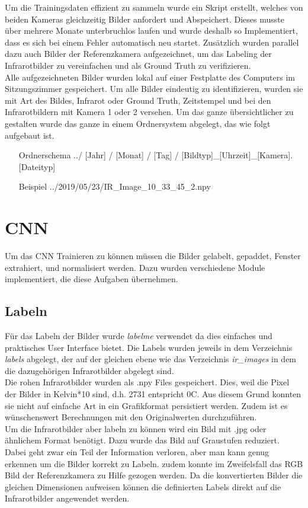 Um die Trainingsdaten effizient zu sammeln wurde ein  Skript erstellt, welches von beiden Kameras gleichzeitig Bilder anfordert und Abspeichert. Dieses musste über mehrere Monate unterbruchlos laufen und wurde deshalb so Implementiert, dass es sich bei einem Fehler automatisch neu startet. Zusätzlich wurden parallel dazu auch Bilder der Referenzkamera aufgezeichnet, um das Labeling der Infrarotbilder zu vereinfachen und als Ground Truth zu verifizieren.\\
Alle aufgezeichneten Bilder wurden lokal auf einer Festplatte des Computers im Sitzungszimmer gespeichert. Um alle Bilder eindeutig zu identifizieren, wurden sie mit Art des Bildes, Infrarot oder Ground Truth, Zeitstempel und bei den Infrarotbildern mit Kamera 1 oder 2 versehen. Um das ganze übersichtlicher zu gestalten wurde das ganze in einem Ordnersystem abgelegt, das wie folgt aufgebaut ist.

\begin{itemize}[leftmargin=4cm, align=left, labelsep=*, labelwidth=*]
	\item[Ordnerschema] ../ [Jahr] / [Monat] / [Tag] / [Bildtyp]\_[Uhrzeit]\_[Kamera].[Dateityp]
	\item[Beispiel] ../2019/05/23/IR\_Image\_10\_33\_45\_2.npy
\end{itemize}


\section{CNN}

Um das \gls{CNN} Trainieren zu können müssen die Bilder gelabelt, gepaddet, Fenster extrahiert, und normalisiert werden. Dazu wurden verschiedene Module implementiert, die diese Aufgaben übernehmen.

\subsection{Labeln}
\label{sec:labeling}

Für das Labeln der Bilder wurde \textit{labelme}\parencite{labelme2016} verwendet da dies einfaches und praktisches User Interface bietet. Die Labels wurden jeweils in dem Verzeichnis \textit{labels} abgelegt, der auf der gleichen ebene wie das Verzeichnis \textit{ir\_images} in dem die dazugehörigen Infrarotbilder abgelegt sind.\\
Die rohen Infrarotbilder wurden als .npy \parencite{npyformat} Files gespeichert. Dies, weil die Pixel der Bilder in Kelvin*10 sind, d.h. 2731 entspricht 0\degree C. Aus diesem Grund konnten sie nicht auf einfache Art in ein Grafikformat persistiert werden. Zudem ist es wünschenswert Berechnungen mit den Originalwerten durchzuführen.\\
Um die Infrarotbilder aber labeln zu können wird ein Bild mit .jpg oder ähnlichem Format benötigt. Dazu wurde das Bild auf Graustufen reduziert. Dabei geht zwar ein Teil der Information verloren, aber man kann genug erkennen um die Bilder korrekt zu Labeln. zudem konnte im Zweifelsfall das RGB Bild der Referenzkamera zu Hilfe gezogen werden. Da die konvertierten Bilder die gleichen Dimensionen aufweisen können die definierten Labels direkt auf die Infrarotbilder angewendet werden.

